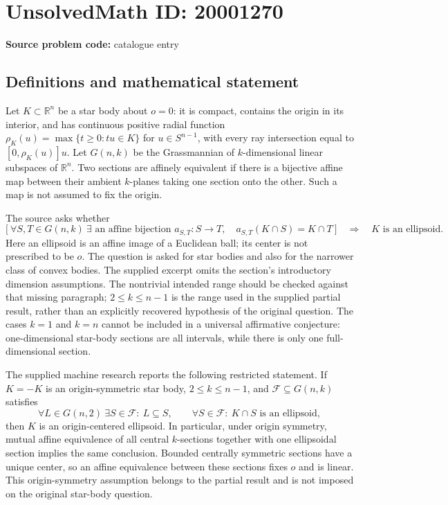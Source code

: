 \documentclass[11pt]{article}
\newcommand{\R}{\mathbb{R}}
\begin{document}
\section*{UnsolvedMath ID: 20001270}
\textbf{Source problem code:} catalogue entry
\subsection{Definitions and mathematical statement}
Let $K\subset\R^n$ be a star body about $o=0$: it is compact, contains the origin in its interior, and has continuous positive radial function $\rho_K(u)=\max\{t\geq0:tu\in K\}$ for $u\in S^{n-1}$, with every ray intersection equal to $[0,\rho_K(u)]u$. Let $G(n,k)$ be the Grassmannian of $k$-dimensional linear subspaces of $\R^n$. Two sections are affinely equivalent if there is a bijective affine map between their ambient $k$-planes taking one section onto the other. Such a map is not assumed to fix the origin.

The source asks whether
\[
 \bigl[\ \forall S,T\in G(n,k)\ \exists\text{ an affine bijection }a_{S,T}:S\to T,
 \quad a_{S,T}(K\cap S)=K\cap T\ \bigr]
 \quad\Longrightarrow\quad K\text{ is an ellipsoid}.
\]
Here an ellipsoid is an affine image of a Euclidean ball; its center is not prescribed to be $o$. The question is asked for star bodies and also for the narrower class of convex bodies. The supplied excerpt omits the section's introductory dimension assumptions. The nontrivial intended range should be checked against that missing paragraph; $2\leq k\leq n-1$ is the range used in the supplied partial result, rather than an explicitly recovered hypothesis of the original question. The cases $k=1$ and $k=n$ cannot be included in a universal affirmative conjecture: one-dimensional star-body sections are all intervals, while there is only one full-dimensional section.

The supplied machine research reports the following restricted statement. If $K=-K$ is an origin-symmetric star body, $2\leq k\leq n-1$, and $\mathcal F\subseteq G(n,k)$ satisfies
\[
 \forall L\in G(n,2)\ \exists S\in\mathcal F:\ L\subseteq S,
 \qquad \forall S\in\mathcal F:\ K\cap S\text{ is an ellipsoid},
\]
then $K$ is an origin-centered ellipsoid. In particular, under origin symmetry, mutual affine equivalence of all central $k$-sections together with one ellipsoidal section implies the same conclusion. Bounded centrally symmetric sections have a unique center, so an affine equivalence between these sections fixes $o$ and is linear. This origin-symmetry assumption belongs to the partial result and is not imposed on the original star-body question.
\end{document}
